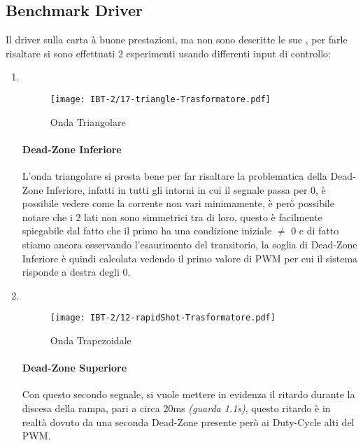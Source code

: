 \subsection{Benchmark Driver}
Il driver sulla carta à buone prestazioni, ma non sono descritte le sue \nonLinearita, per farle risaltare si sono effettuati 2 esperimenti usando differenti input di controllo:
\begin{enumerate}
	\item {} \\ \vspace{-11mm}
	      \begin{figure}[h]
		      \centering
		      \texttt{[image: IBT-2/17-triangle-Trasformatore.pdf]}
		      \caption[Esperimento con Onda Triangolare]{Onda Triangolare}
	      \end{figure}\vspace{-10mm}
	      \paragraph{Dead-Zone Inferiore} L'onda triangolare si presta bene per far risaltare la problematica della Dead-Zone Inferiore, infatti in tutti gli intorni in cui il segnale passa per 0, è possibile vedere come la corrente non vari minimamente, è però possibile notare che i 2 lati non sono simmetrici tra di loro, questo è facilmente spiegabile dal fatto che il primo ha una condizione iniziale $ \neq $ 0 e di fatto stiamo ancora osservando l'esaurimento del transitorio, la soglia di Dead-Zone Inferiore è quindi calcolata vedendo il primo valore di PWM  per cui il sistema risponde a destra degli 0.      
	      
	      \newpage
	\item {} \\
	      \begin{figure}[h]
		      \centering
		      \texttt{[image: IBT-2/12-rapidShot-Trasformatore.pdf]}
		      \caption[Esperimento con Onda Trapezoidale]{Onda Trapezoidale}
	      \end{figure}  \vspace{-10mm}
	      \paragraph{Dead-Zone Superiore} Con questo secondo segnale, si vuole mettere in evidenza il ritardo durante la discesa della rampa, pari a circa 20ms {\small \textit{(guarda 1.1s)}}, questo ritardo è in realtà dovuto da una seconda Dead-Zone presente però ai Duty-Cycle alti del PWM.
	      \vspace{-5mm}

\end{enumerate}
